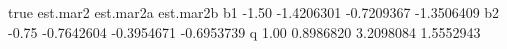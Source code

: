 \begin{Schunk}
\begin{Soutput}
    true   est.mar2  est.mar2a  est.mar2b
b1 -1.50 -1.4206301 -0.7209367 -1.3506409
b2 -0.75 -0.7642604 -0.3954671 -0.6953739
q   1.00  0.8986820  3.2098084  1.5552943
\end{Soutput}
\end{Schunk}
